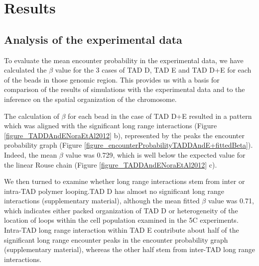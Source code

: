 \documentclass[12pt]{article}
\begin{document}






\section{Results}\label{section_results}
\subsection{Analysis of the experimental data}\label{subsection_analysisOfTheExperimentalData}

To evaluate the mean encounter probability in the experimental data, we have calculated the $\beta$ value for the 3 cases of TAD D, TAD E and TAD D+E for each of the beads in those genomic region. This provides us with a basis for comparison of the results of simulations with the experimental data and to the inference on the spatial organization of the chromosome.

The calculation of $\beta$ for each bead in the case of TAD D+E resulted in a pattern which was aligned with the significant long range interactions (Figure \ref{figure_TADDAndENoraEtAl2012} b), represented by the peaks the encounter probability graph (Figure \ref{figure_encounterProbabilityTADDAndE+fittedBeta}). Indeed, the mean $\beta$ value was 0.729, which is well below the expected value for the linear Rouse chain (Figure \ref{figure_TADDAndENoraEtAl2012} c).

We then turned to examine whether long range interactions stem from inter or intra-TAD polymer looping.TAD D has almost no significant long range interactions (supplementary material), although the mean fitted $\beta$ value was 0.71, which indicates either packed organization of TAD D or heterogeneity of the location of loops within the cell population examined in the 5C experiments.
Intra-TAD long range interaction within TAD E contribute about half of the significant long range encounter peaks in the encounter probability graph (supplementary material), whereas the other half stem from inter-TAD long range interactions.
\end{document}
